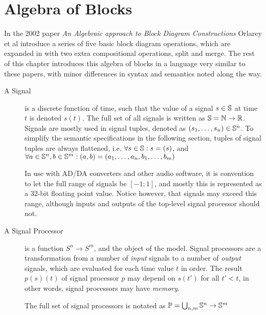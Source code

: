 \section{Algebra of Blocks}

In the 2002 paper \emph{An Algebraic approach to Block Diagram Constructions}\autocite{orlarey2002} Orlarey et al introduce a series of five
basic block diagram operations, which are expanded in \autocite{orlarey2004} with two extra compositional
operations, split and merge. The rest of this chapter introduces this algebra of blocks in a language very
similar to these papers, with minor differences in syntax and semantics noted along the way.

\begin{description}
  \item[A Signal] is a discrete function of time, such that the value of a signal $s \in \mathbb{S}$ at time
        $t$ is denoted $s(t)$. The full set of all signals is written as
        $\mathbb{S} = \mathbb N \rightarrow \mathbb R$. Signals are mostly used in signal tuples, denoted as $(s_1, \dots, s_n) \in \mathbb{S}^n$. To
        simplify the semantic specifications in the following section, tuples of signal tuples are always flattened,
        i.e. $\forall s \in \mathbb{S}: s = (s)$, and $\forall a \in \mathbb{S}^n, b \in \mathbb{S}^m : (a, b) = (a_1, \dots, a_n, b_1, \dots, b_m)$

        In use with AD/DA converters and other audio software, it is convention to let the full range of signals be
        $[-1; 1]$, and mostly this is represented as a 32-bit floating point value. Notice however, that
        signals may exceed this range, although inputs and outputs of the top-level signal processor should not.

  \item[A Signal Processor] is a function $S^n \rightarrow S^m$, and the object of the model. Signal processors are
        a transformation from a number of \emph{input} signals to a number of \emph{output}
        signals, which are evaluated for each time value $t$ in order. The result
        $p(s)(t)$ of signal processor $p$ may depend on $s(t')$ for
        all $t' < t$, in other words, signal processors may have \emph{memory}.

        The full set of signal processors is notated as $\mathbb P = \bigcup_{n,m} \mathbb{S}^n \rightarrow \mathbb{S}^m$


\end{description}
